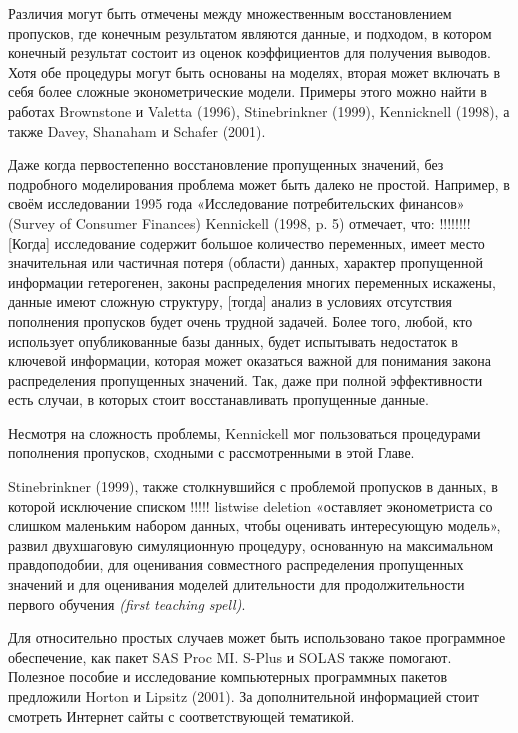 Различия могут быть отмечены между множественным восстановлением пропусков, где конечным результатом являются данные, и подходом, в котором конечный результат состоит из оценок коэффициентов для получения выводов. Хотя обе процедуры могут быть основаны на моделях, вторая может включать в себя более сложные эконометрические модели. Примеры этого можно найти в работах Brownstone и Valetta (1996), Stinebrinkner (1999), Kennicknell (1998), а также Davey, Shanaham и Schafer (2001).

Даже когда первостепенно восстановление пропущенных значений, без подробного моделирования проблема может быть далеко не простой. Например, в своём исследовании 1995 года «Исследование потребительских финансов» (Survey of Consumer Finances) Kennickell (1998, p. 5) отмечает, что:
!!!!!!!!
[Когда] исследование содержит большое количество переменных, имеет место значительная или частичная потеря (области) данных, характер пропущенной информации гетерогенен, законы распределения многих переменных искажены, данные имеют сложную структуру, [тогда] анализ в условиях отсутствия пополнения пропусков будет очень трудной задачей. Более того, любой, кто использует опубликованные базы данных, будет испытывать недостаток в ключевой информации, которая может оказаться важной для понимания закона распределения пропущенных значений. Так, даже при полной эффективности есть случаи, в которых стоит восстанавливать пропущенные данные.

Несмотря на сложность проблемы, Kennickell мог пользоваться процедурами пополнения пропусков, сходными с рассмотренными в этой Главе.

Stinebrinkner (1999), также столкнувшийся с проблемой пропусков в данных, в которой исключение списком !!!!! listwise deletion «оставляет эконометриста со слишком маленьким набором данных, чтобы оценивать интересующую модель», развил двухшаговую симуляционную процедуру, основанную на максимальном правдоподобии, для оценивания совместного распределения пропущенных значений и для оценивания моделей длительности для продолжительности первого обучения \emph{(first teaching spell)}.

Для относительно простых случаев может быть использовано такое программное обеспечение, как пакет SAS Proc MI. S-Plus и SOLAS также помогают. Полезное пособие и исследование компьютерных программных пакетов предложили Horton и Lipsitz (2001). За дополнительной информацией стоит смотреть Интернет сайты с соответствующей тематикой.

